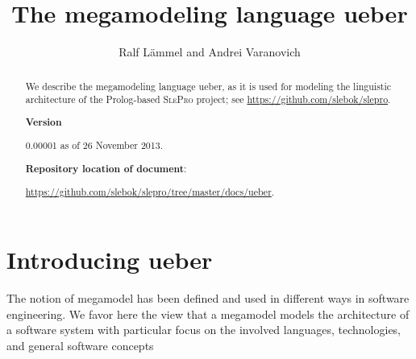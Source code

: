 \documentclass[preprint,authoryear,12pt]{noelsarticle}
\newcommand{\slepro}{\textsc{SlePro}}
\newcommand{\ueber}{\textsf{ueber}}
\begin{document}
\begin{frontmatter}

\title{The megamodeling language \ueber}

\author{Ralf L\"ammel and Andrei Varanovich}

\address{Software Languages Team\\University of Koblenz-Landau, Germany}

\begin{abstract}
  We describe the megamodeling language \ueber, as it is used for
  modeling the linguistic architecture of the Prolog-based \slepro{}
  project; see \url{https://github.com/slebok/slepro}.

\bigskip

\begin{comment}
\noindent
\textbf{Acknowledgement}: {\small This document and the underlying
  development are parts of a broader effort on language modeling and
  software language engineering---joint work with \emph{Anya Helene
    Bagge}, University of Bergen. Helpful interaction with and
  feedback by Andrei Varanovich, University of Koblenz-Landau, is also
  gratefully acknowledged.}
\end{comment}

\medskip

\noindent
\textbf{Version}

0.00001 as of 26 November 2013.

\medskip

\noindent
\textbf{Repository location of document}: 

\url{https://github.com/slebok/slepro/tree/master/docs/ueber}.
\end{abstract}

\end{frontmatter}

\pagebreak


\tableofcontents

\pagebreak


\section{Introducing \ueber}

The notion of megamodel has been defined and used in different ways in
software engineering. We favor here the view that a megamodel models
the architecture of a software system with particular focus on the
involved languages, technologies, and general software
concepts~\citep{FavreLV12}
\end{document}
